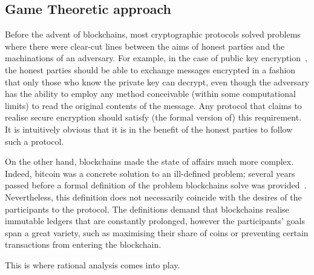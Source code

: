 \subsection{Game Theoretic approach}
  Before the advent of blockchains, most cryptographic protocols solved problems where
  there were clear-cut lines between the aims of honest parties and the machinations of an
  adversary. For example, in the case of public key encryption~\cite{dh}, the honest
  parties should be able to exchange messages encrypted in a fashion that only those who
  know the private key can decrypt, even though the adversary has the ability to employ
  any method conceivable (within some computational limits) to read the original contents
  of the message. Any protocol that claims to realise secure encryption should satisfy
  (the formal version of) this requirement. It is intuitively obvious that it is in the
  benefit of the honest parties to follow such a protocol.

  On the other hand, blockchains made the state of affairs much more complex. Indeed,
  bitcoin was a concrete solution to an ill-defined problem; several years passed before a
  formal definition of the problem blockchains solve was provided~\cite{backbone}.
  Nevertheless, this definition does not necessarily coincide with the desires of the
  participants to the protocol. The definitions demand that blockchains realise immutable
  ledgers that are constantly prolonged, however the participants' goals span a great
  variety, such as maximising their share of coins or preventing certain transactions from
  entering the blockchain.

  This is where rational analysis comes into play.
